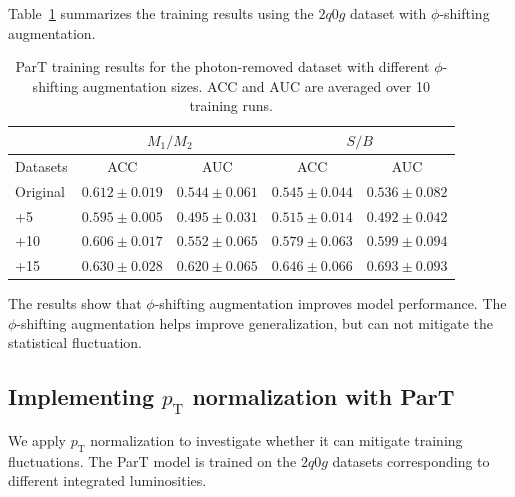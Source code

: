 \documentclass[12pt]{article}
\begin{document}
        Table~\ref{tab:CWoLa_ParT_training_results_100_jet_tagging_phi_aug_5_10_15} summarizes the training results using the $2q0g$ dataset with $\phi$-shifting augmentation.
        \begin{table}[htpb]
            \centering
            \caption{ParT training results for the photon-removed dataset with different $\phi$-shifting augmentation sizes. ACC and AUC are averaged over 10 training runs.}
            \label{tab:CWoLa_ParT_training_results_100_jet_tagging_phi_aug_5_10_15}
            \begin{tabular}{l|cc|cc}
                         & \multicolumn{2}{c|}{$M_1 / M_2$}      & \multicolumn{2}{c}{$S / B$}           \\ \hline
                Datasets & ACC               & AUC               & ACC               & AUC               \\ \hline
                Original & $0.612 \pm 0.019$ & $0.544 \pm 0.061$ & $0.545 \pm 0.044$ & $0.536 \pm 0.082$ \\
                +5       & $0.595 \pm 0.005$ & $0.495 \pm 0.031$ & $0.515 \pm 0.014$ & $0.492 \pm 0.042$ \\
                +10      & $0.606 \pm 0.017$ & $0.552 \pm 0.065$ & $0.579 \pm 0.063$ & $0.599 \pm 0.094$ \\
                +15      & $0.630 \pm 0.028$ & $0.620 \pm 0.065$ & $0.646 \pm 0.066$ & $0.693 \pm 0.093$
            \end{tabular}
        \end{table}
        The results show that $\phi$-shifting augmentation improves model performance. The $\phi$-shifting augmentation helps improve generalization, but can not mitigate the statistical fluctuation.
    \subsection{Implementing \texorpdfstring{$p_{\mathrm{T}}$}{pT} normalization with ParT}%
    \label{sub:implement_pt_normalization_with_part}
        We apply $p_{\text{T}}$ normalization to investigate whether it can mitigate training fluctuations. The ParT model is trained on the $2q0g$ datasets corresponding to different integrated luminosities.
\end{document}
